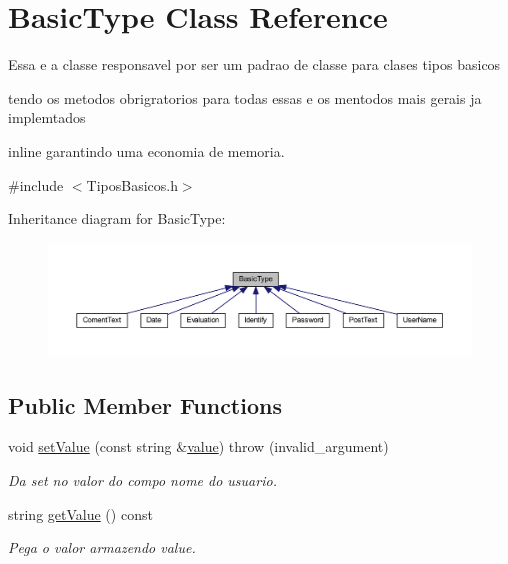 \hypertarget{class_basic_type}{\section{Basic\-Type Class Reference}
\label{class_basic_type}
}


Essa e a classe responsavel por ser um padrao de classe para clases tipos basicos \par
 tendo os metodos obrigratorios para todas essas e os mentodos mais gerais ja implemtados\par
 inline garantindo uma economia de memoria.  




{\ttfamily \#include $<$Tipos\-Basicos.\-h$>$}



Inheritance diagram for Basic\-Type\-:\nopagebreak
\begin{figure}[H]
\begin{center}
\leavevmode
\includegraphics[width=350pt]{class_basic_type__inherit__graph}
\end{center}
\end{figure}
\subsection*{Public Member Functions}
\begin{DoxyCompactItemize}
\item 
void \hyperlink{class_basic_type_a94da6e04e150bbfc35072df5897e8e21}{set\-Value} (const string \&\hyperlink{class_basic_type_af9b2c5cc32647df01083a6802e913dbf}{value})  throw (invalid\-\_\-argument)
\begin{DoxyCompactList}\small\item\em Da set no valor do compo nome do usuario. \end{DoxyCompactList}\item 
string \hyperlink{class_basic_type_af0b6be797220a64bc975744cd65c93ab}{get\-Value} () const 
\begin{DoxyCompactList}\small\item\em Pega o valor armazendo value. \end{DoxyCompactList}\end{DoxyCompactItemize}
